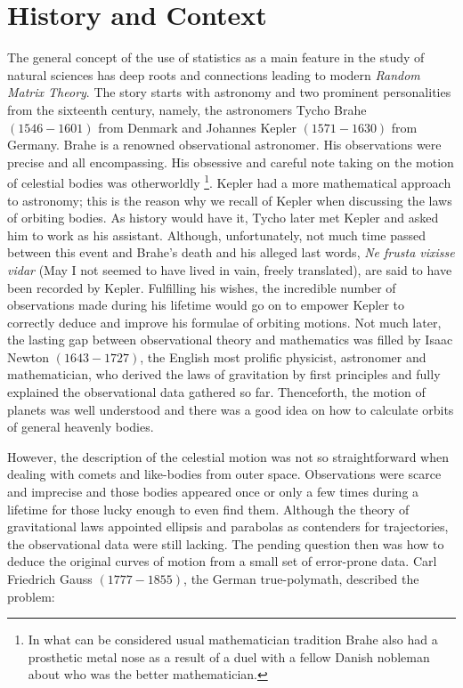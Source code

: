 \section{History and Context}
\label{section: history,context}

The general concept of the use of statistics as a main feature in the study of natural sciences has deep roots and connections leading to modern \textit{Random Matrix Theory}. The story starts with astronomy and two prominent personalities from the sixteenth century, namely, the astronomers Tycho Brahe $(1546-1601)$ from Denmark and Johannes Kepler $(1571-1630)$ from Germany. Brahe is a renowned observational astronomer. His observations were precise and all encompassing. His obsessive and careful note taking on the motion of celestial bodies was otherworldly \footnote{In what can be considered usual mathematician tradition Brahe also had a prosthetic metal nose as a result of a duel with a fellow Danish nobleman about who was the better mathematician.}. Kepler had a more mathematical approach to astronomy; this is the reason why we recall of Kepler when discussing the laws of orbiting bodies. As history would have it, Tycho later met Kepler and asked him to work as his assistant. Although, unfortunately, not much time passed between this event and Brahe's death and his alleged last words, \textit{Ne frusta vixisse vidar} (May I not seemed to have lived in vain, freely translated), are said to have been recorded by Kepler. Fulfilling his wishes, the incredible number of observations made during his lifetime would go on to empower Kepler to correctly deduce and improve his formulae of orbiting motions. Not much later, the lasting gap between observational theory and mathematics was filled by Isaac Newton $(1643-1727)$, the English most prolific physicist, astronomer and mathematician, who derived the laws of gravitation by first principles and fully explained the observational data gathered so far. Thenceforth, the motion of planets was well understood and there was a good idea on how to calculate orbits of general heavenly bodies.

However, the description of the celestial motion was not so straightforward when dealing with comets and like-bodies from outer space. Observations were scarce and imprecise and those bodies appeared once or only a few times during a lifetime for those lucky enough to even find them. Although the theory of gravitational laws appointed ellipsis and parabolas as contenders for trajectories, the observational data were still lacking. The pending question then was how to deduce the original curves of motion from a small set of error-prone data. Carl Friedrich Gauss $(1777-1855)$, the German true-polymath, described the problem:

